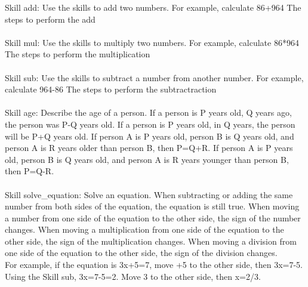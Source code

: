 \documentclass{article} \usepackage{arxiv}
\begin{document}
\begin{tcolorbox}[title = {Skills for GSM8K}, colback = Apricot!25!white, colframe = BrickRed!75!black,fontupper =\fontsize{9pt}{9pt}\selectfont]
Skill add: Use the skills to add two numbers. For example, calculate 86+964 The steps to perform the add \\ \\


Skill mul: Use the skills to multiply two numbers. For example, calculate 86*964 The steps to perform the multiplication \\ \\

Skill sub:  Use the skills to subtract a number from another number. For example, calculate 964-86 The steps to perform the subtractraction \\ \\

Skill age: Describe the age of a person.  If a person is P years old, Q years ago, the person was P-Q years old.  If a person is P years old, in Q years, the person will be P+Q years old. If person A is P years old, person B is Q years old, and person A is R years older than person B, then P=Q+R. If person A is P years old, person B is Q years old, and person A is R years younger than person B, then P=Q-R. \\ \\


Skill solve\_equation: Solve an equation. When subtracting or adding the same number from both sides of the equation, the equation is still true. When moving a number from one side of the equation to the other side, the sign of the number changes. When moving a multiplication from one side of the equation to the other side, the sign of the multiplication changes. When moving a division from one side of the equation to the other side, the sign of the division changes. \\
For example, if the equation is 3x+5=7, move +5 to the other side, then 3x=7-5. Using the Skill sub, 3x=7-5=2. Move 3 to the other side, then x=2/3. \\ 
\end{tcolorbox}
\noindent\begin{minipage}{\textwidth} 
 \label{Tab:gsm8k_skill}
\end{minipage}

\newpage
\end{document}
